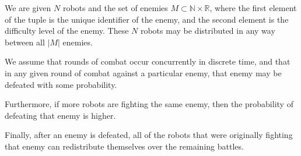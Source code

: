 \documentclass[11pt]{article}
\theoremstyle{definition}
\newcommand{\abs}[1]{\left\vert{#1}\right\vert}
\begin{document}
We are given $ N $ robots and the set of enemies
$ M \subset \mathbb{N} \times \mathbb{R} $,
where the first element of the tuple is the unique identifier
of the enemy, and the second element is the difficulty level
of the enemy. These $ N $ robots may be distributed
in any way between all $ \abs{M} $ enemies.

We assume that rounds of combat occur concurrently in discrete time,
and that in any given round of combat against a
particular enemy, that enemy may be defeated
with some probability.

Furthermore, if more robots are fighting
the same enemy, then the probability of
defeating that enemy is higher.

Finally, after an enemy is defeated, all of
the robots that were originally fighting
that enemy can redistribute themselves
over the remaining battles.
\end{document}
